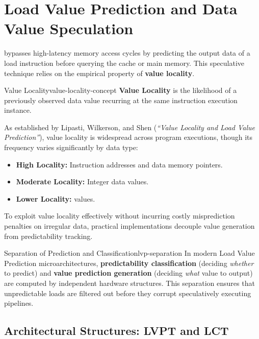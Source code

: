 \section{Load Value Prediction and Data Value Speculation}
\label{sec:load_value_prediction_speculation}

 bypasses high-latency memory access cycles by predicting the output data of a load instruction before querying the cache or main memory. This speculative technique relies on the empirical property of \textbf{value locality}.

\begin{concept}{Value Locality}{value-locality-concept}
\textbf{Value Locality} is the likelihood of a previously observed data value recurring at the same instruction execution instance. 

As established by Lipasti, Wilkerson, and Shen (\textit{``Value Locality and Load Value Prediction''}), value locality is widespread across program executions, though its frequency varies significantly by data type:
\begin{itemize}
    \item \textbf{High Locality:} Instruction addresses and data memory pointers.
    \item \textbf{Moderate Locality:} Integer data values.
    \item \textbf{Lower Locality:}  values.
\end{itemize}
\end{concept}

To exploit value locality effectively without incurring costly misprediction penalties on irregular data, practical implementations decouple value generation from predictability tracking.

\begin{observation}{Separation of Prediction and Classification}{lvp-separation}
In modern Load Value Prediction microarchitectures, \textbf{predictability classification} (deciding \textit{whether} to predict) and \textbf{value prediction generation} (deciding \textit{what} value to output) are computed by independent hardware structures. This separation ensures that unpredictable loads are filtered out before they corrupt speculatively executing pipelines.
\end{observation}

\subsection{Architectural Structures: LVPT and LCT}

